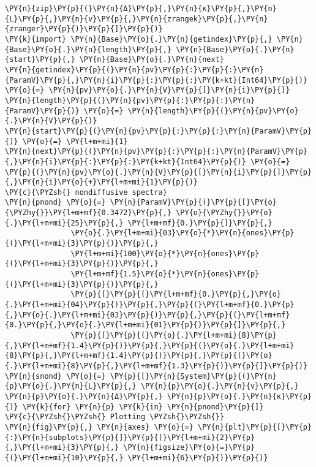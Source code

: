 \begin{Verbatim}[commandchars=\\\{\}]
                   \PY{n}{zip}\PY{p}{(}\PY{n}{Δ}\PY{p}{,}\PY{n}{κ}\PY{p}{,}\PY{n}{L}\PY{p}{,}\PY{n}{v}\PY{p}{,}\PY{n}{zrangek}\PY{p}{,}\PY{n}{zranger}\PY{p}{)}\PY{p}{]}\PY{p}{)}
\PY{k}{import} \PY{n}{Base}\PY{o}{.}\PY{n}{getindex}\PY{p}{,} \PY{n}{Base}\PY{o}{.}\PY{n}{length}\PY{p}{,} \PY{n}{Base}\PY{o}{.}\PY{n}{start}\PY{p}{,} \PY{n}{Base}\PY{o}{.}\PY{n}{next}
\PY{n}{getindex}\PY{p}{(}\PY{n}{pv}\PY{p}{:}\PY{p}{:}\PY{n}{ParamV}\PY{p}{,}\PY{n}{i}\PY{p}{:}\PY{p}{:}\PY{k+kt}{Int64}\PY{p}{)} \PY{o}{=} \PY{n}{pv}\PY{o}{.}\PY{n}{V}\PY{p}{[}\PY{n}{i}\PY{p}{]}
\PY{n}{length}\PY{p}{(}\PY{n}{pv}\PY{p}{:}\PY{p}{:}\PY{n}{ParamV}\PY{p}{)} \PY{o}{=} \PY{n}{length}\PY{p}{(}\PY{n}{pv}\PY{o}{.}\PY{n}{V}\PY{p}{)}
\PY{n}{start}\PY{p}{(}\PY{n}{pv}\PY{p}{:}\PY{p}{:}\PY{n}{ParamV}\PY{p}{)} \PY{o}{=} \PY{l+m+mi}{1}
\PY{n}{next}\PY{p}{(}\PY{n}{pv}\PY{p}{:}\PY{p}{:}\PY{n}{ParamV}\PY{p}{,}\PY{n}{i}\PY{p}{:}\PY{p}{:}\PY{k+kt}{Int64}\PY{p}{)} \PY{o}{=} \PY{p}{(}\PY{n}{pv}\PY{o}{.}\PY{n}{V}\PY{p}{[}\PY{n}{i}\PY{p}{]}\PY{p}{,}\PY{n}{i}\PY{o}{+}\PY{l+m+mi}{1}\PY{p}{)}
\PY{c}{\PYZsh{} nondiffusive spectra}
\PY{n}{pnond} \PY{o}{=} \PY{n}{ParamV}\PY{p}{(}\PY{p}{[}\PY{o}{\PYZhy{}}\PY{l+m+mf}{0.3472}\PY{p}{,} \PY{o}{\PYZhy{}}\PY{o}{.}\PY{l+m+mi}{25}\PY{p}{,} \PY{l+m+mf}{0.}\PY{p}{]}\PY{p}{,}
               \PY{o}{.}\PY{l+m+mi}{03}\PY{o}{*}\PY{n}{ones}\PY{p}{(}\PY{l+m+mi}{3}\PY{p}{)}\PY{p}{,}
               \PY{l+m+mi}{100}\PY{o}{*}\PY{n}{ones}\PY{p}{(}\PY{l+m+mi}{3}\PY{p}{)}\PY{p}{,}
               \PY{l+m+mf}{1.5}\PY{o}{*}\PY{n}{ones}\PY{p}{(}\PY{l+m+mi}{3}\PY{p}{)}\PY{p}{,}
               \PY{p}{[}\PY{p}{(}\PY{l+m+mf}{0.}\PY{p}{,}\PY{o}{.}\PY{l+m+mi}{04}\PY{p}{)}\PY{p}{,}\PY{p}{(}\PY{l+m+mf}{0.}\PY{p}{,}\PY{o}{.}\PY{l+m+mi}{03}\PY{p}{)}\PY{p}{,}\PY{p}{(}\PY{l+m+mf}{0.}\PY{p}{,}\PY{o}{.}\PY{l+m+mi}{01}\PY{p}{)}\PY{p}{]}\PY{p}{,}
               \PY{p}{[}\PY{p}{(}\PY{o}{.}\PY{l+m+mi}{8}\PY{p}{,}\PY{l+m+mf}{1.4}\PY{p}{)}\PY{p}{,}\PY{p}{(}\PY{o}{.}\PY{l+m+mi}{8}\PY{p}{,}\PY{l+m+mf}{1.4}\PY{p}{)}\PY{p}{,}\PY{p}{(}\PY{o}{.}\PY{l+m+mi}{8}\PY{p}{,}\PY{l+m+mf}{1.3}\PY{p}{)}\PY{p}{]}\PY{p}{)}
\PY{n}{snond} \PY{o}{=} \PY{p}{[}\PY{n}{System}\PY{p}{(}\PY{n}{p}\PY{o}{.}\PY{n}{L}\PY{p}{,} \PY{n}{p}\PY{o}{.}\PY{n}{v}\PY{p}{,} \PY{n}{p}\PY{o}{.}\PY{n}{Δ}\PY{p}{,} \PY{n}{p}\PY{o}{.}\PY{n}{κ}\PY{p}{)} \PY{k}{for} \PY{n}{p} \PY{k}{in} \PY{n}{pnond}\PY{p}{]}
\PY{c}{\PYZsh{}\PYZsh{} Plotting \PYZsh{}\PYZsh{}}
\PY{n}{fig}\PY{p}{,} \PY{n}{axes} \PY{o}{=} \PY{n}{plt}\PY{p}{[}\PY{p}{:}\PY{n}{subplots}\PY{p}{]}\PY{p}{(}\PY{l+m+mi}{2}\PY{p}{,}\PY{l+m+mi}{3}\PY{p}{,} \PY{n}{figsize}\PY{o}{=}\PY{p}{(}\PY{l+m+mi}{10}\PY{p}{,} \PY{l+m+mi}{6}\PY{p}{)}\PY{p}{)}

\end{Verbatim}
